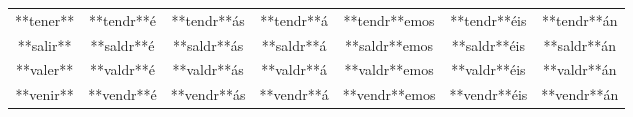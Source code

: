 \begin{tabular}{ccccccc}
**tener**       & **tendr**é     & **tendr**ás     & **tendr**á          & **tendr**emos      & **tendr**éis       & **tendr**án               \\
**salir**       & **saldr**é     & **saldr**ás     & **saldr**á          & **saldr**emos      & **saldr**éis       & **saldr**án               \\
**valer**       & **valdr**é     & **valdr**ás     & **valdr**á          & **valdr**emos      & **valdr**éis       & **valdr**án               \\
**venir**       & **vendr**é     & **vendr**ás     & **vendr**á          & **vendr**emos      & **vendr**éis       & **vendr**án               \\
\bottomrule
\end{tabular}


